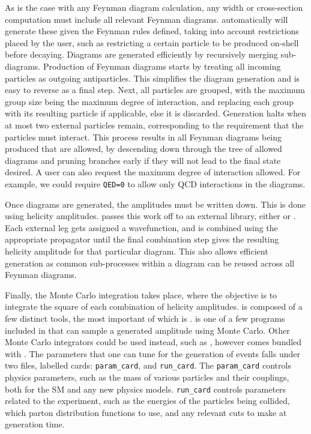 As is the case with any Feynman diagram calculation, any width or cross-section computation must include all relevant Feynman diagrams.
\madgraph automatically will generate these given the Feynman rules defined, taking into account restrictions placed by the user, such as restricting a certain particle to be produced on-shell before decaying.
Diagrams are generated efficiently by recursively merging sub-diagrams.
Production of Feynman diagrams starts by treating all incoming particles as outgoing antiparticles.
This simplifies the diagram generation and is easy to reverse as a final step.
Next, all particles are grouped, with the maximum group size being the maximum degree of interaction, and replacing each group with its resulting particle if applicable, else it is discarded.
Generation halts when at most two external particles remain, corresponding to the requirement that the particles must interact.
This process results in all Feynman diagrams being produced that are allowed, by descending down through the tree of allowed diagrams and pruning branches early if they will not lead to the final state desired.
A user can also request the maximum degree of interaction allowed.
For example, we could require \texttt{QED=0} to allow only QCD interactions in the diagrams.

Once diagrams are generated, the amplitudes must be written down.
This is done using helicity amplitudes.
\madgraph passes this work off to an external library, either \helas \cite{Murayama:1992gi} or \aloha \cite{deAquino:2011ub}.
Each external leg gets assigned a wavefunction, and is combined using the appropriate propagator until the final combination step gives the resulting helicity amplitude for that particular diagram.
This also allows efficient generation as common sub-processes within a diagram can be reused across all Feynman diagrams.

Finally, the Monte Carlo integration takes place, where the objective is to integrate the square of each combination of helicity amplitudes.
\madgraph is composed of a few distinct tools, the most important of which is \madevent.
\madevent is one of a few programs included in \madgraph that can sample a generated amplitude using Monte Carlo.
Other Monte Carlo integrators could be used instead, such as \pythia, however \madevent comes bundled with \madgraph.
The parameters that one can tune for the generation of events falls under two files, labelled cards: \texttt{param\_card}, and \texttt{run\_card}.
The \texttt{param\_card} controls physics parameters, such as the mass of various particles and their couplings, both for the SM and any new physics models.
\texttt{run\_card} controls parameters related to the experiment, such as the energies of the particles being collided, which parton distribution functions to use, and any relevant cuts to make at generation time.

